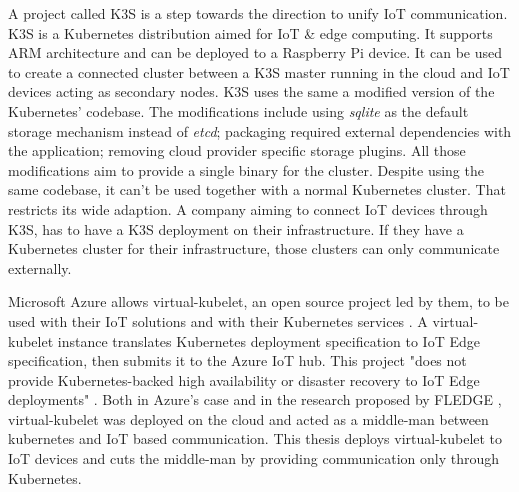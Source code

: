 A project called K3S \cite{k3s} is a step towards the direction to unify IoT communication. K3S is a Kubernetes distribution aimed for IoT \& edge computing. It supports ARM architecture and can be deployed to a Raspberry Pi device. It can be used to create a connected cluster between a K3S master running in the cloud and IoT devices acting as secondary nodes. K3S uses the same a modified version of the Kubernetes' codebase. The modifications include using \textit{sqlite} as the default storage mechanism instead of \textit{etcd}; packaging required external dependencies with the application; removing cloud provider specific storage plugins. All those modifications aim to provide a single binary for the cluster. Despite using the same codebase, it can't be used together with a normal Kubernetes cluster. That restricts its wide adaption. A company aiming to connect IoT devices through K3S, has to have a K3S deployment on their infrastructure. If they have a Kubernetes cluster for their infrastructure, those clusters can only communicate externally.

Microsoft Azure allows virtual-kubelet, an open source project led by them, to be used with their IoT solutions and with their Kubernetes services \cite{Chandra2019}. A virtual-kubelet instance translates Kubernetes deployment specification to IoT Edge specification, then submits it to the Azure IoT hub. This project "does not provide Kubernetes-backed high availability or disaster recovery to IoT Edge deployments" \cite{azure-vk-github}. Both in Azure's case and in the research proposed by FLEDGE \cite{fledge}, virtual-kubelet was deployed on the cloud and acted as a middle-man between kubernetes and IoT based communication. This thesis deploys virtual-kubelet to IoT devices and cuts the middle-man by providing communication only through Kubernetes.